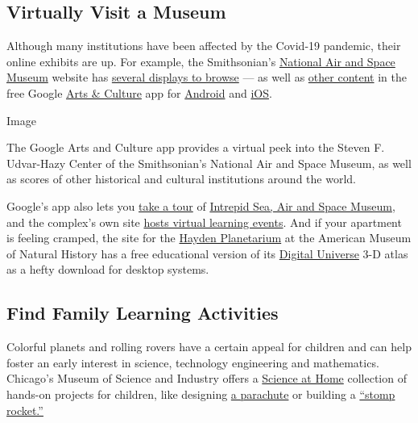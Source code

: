 \hypertarget{virtually-visit-a-museum}{%
\subsection{Virtually Visit a Museum}\label{virtually-visit-a-museum}}

Although many institutions have been affected by the Covid-19 pandemic,
their online exhibits are up. For example, the Smithsonian's
\href{https://airandspace.si.edu}{National Air and Space Museum} website
has \href{https://airandspace.si.edu/exhibitions/online}{several
displays to browse} --- as well as
\href{https://artsandculture.google.com/partner/smithsonian-national-air-and-space-museum}{other
content} in the free Google
\href{https://artsandculture.google.com/}{Arts \& Culture} app for
\href{https://play.google.com/store/apps/details?id=com.google.android.apps.cultural}{Android}
and
\href{https://apps.apple.com/us/app/google-arts-culture/id1050970557}{iOS}.

Image

The Google Arts and Culture app provides a virtual peek into the Steven
F. Udvar-Hazy Center of the Smithsonian's National Air and Space Museum,
as well as scores of other historical and cultural institutions around
the world.

Google's app also lets you
\href{https://artsandculture.google.com/partner/intrepid-sea-air-and-space-museum}{take
a tour} of \href{https://www.intrepidmuseum.org/}{Intrepid Sea, Air and
Space Museum}, and the complex's own site
\href{https://www.intrepidmuseum.org/digital-resources}{hosts virtual
learning events}. And if your apartment is feeling cramped, the site for
the \href{https://www.amnh.org/research/hayden-planetarium}{Hayden
Planetarium} at the American Museum of Natural History has a free
educational version of its
\href{https://www.amnh.org/research/hayden-planetarium/digital-universe}{Digital
Universe} 3-D atlas as a hefty download for desktop systems.

\hypertarget{find-family-learning-activities}{%
\subsection{Find Family Learning
Activities}\label{find-family-learning-activities}}

Colorful planets and rolling rovers have a certain appeal for children
and can help foster an early interest in science, technology engineering
and mathematics. Chicago's Museum of Science and Industry offers a
\href{https://www.msichicago.org/science-at-home/hands-on-science/}{Science
at Home} collection of hands-on projects for children, like designing
\href{https://www.msichicago.org/science-at-home/hands-on-science/parachute-design/}{a
parachute} or building a
\href{https://www.msichicago.org/science-at-home/hands-on-science/stomp-rocket/}{``stomp
rocket.''}

